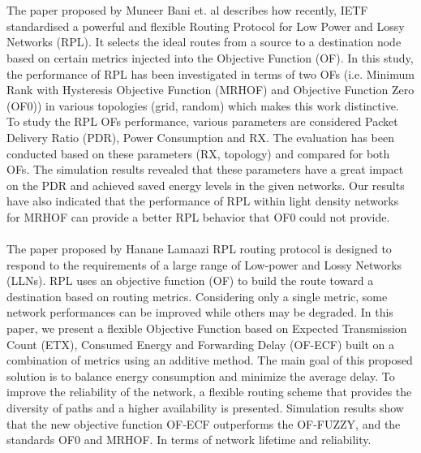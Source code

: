 \\
\\
The paper proposed by Muneer Bani et. al describes how recently, IETF standardised a powerful and flexible Routing Protocol for Low Power and Lossy Networks (RPL). It selects the ideal routes from a source to a destination node based on certain metrics injected into the Objective Function (OF). In this study, the performance of RPL has been investigated in terms of two OFs (i.e. Minimum Rank with Hysteresis Objective Function (MRHOF) and Objective Function Zero (OF0)) in various topologies (grid, random) which makes this work distinctive. To study the RPL OFs performance, various parameters are considered Packet Delivery Ratio (PDR), Power Consumption and RX. The evaluation has been conducted based on these parameters (RX, topology) and compared for both OFs. The simulation results revealed that these parameters have a great impact on the PDR and achieved saved energy levels in the given networks. Our results have also indicated that the performance of RPL within light density networks for MRHOF can provide a better RPL behavior that OF0 could not provide\cite{3}.
\\
\\
The paper proposed by Hanane Lamaazi RPL  routing  protocol is designed  to  respond  to the requirements  of  a  large  range  of  Low-power  and  Lossy  Networks (LLNs). RPL uses an objective function (OF) to build the route toward a  destination  based  on  routing  metrics.  Considering  only  a  single metric, some network performances can be improved while others may be degraded. In  this paper, we present  a  flexible Objective  Function based on Expected Transmission Count (ETX), Consumed Energy and Forwarding Delay (OF-ECF) built on a combination of metrics using an  additive  method. The  main  goal  of  this  proposed  solution  is to balance  energy  consumption  and  minimize  the  average  delay.  To improve the reliability  of the network, a flexible routing  scheme that provides the diversity of paths  and  a higher availability is presented. Simulation  results  show  that  the  new  objective  function  OF-ECF outperforms the OF-FUZZY, and the standards OF0 and MRHOF.  In terms of network lifetime and reliability\cite{4}.
\\
\\
